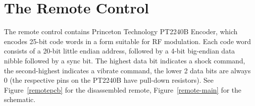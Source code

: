 \documentclass[a4paper]{article}
\begin{document}
\section{The Remote Control}

The remote control contains Princeton Technology PT2240B Encoder, which encodes 25-bit code words in a form suitable for RF modulation. Each code word consists of a 20-bit little endian address, followed by a 4-bit big-endian data nibble followed by a sync bit. The highest data bit indicates a shock command, the second-highest indicates a vibrate command, the lower 2 data bits are always 0 (the respective pins on the PT2240B have pull-down resistors). See Figure~\ref{remotepcb} for the disassembled remote, Figure~\ref{remote-main} for the schematic.

\begin{figure}

\end{figure}
\end{document}
